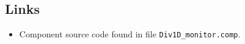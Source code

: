 \subsection*{Links}
\begin{itemize}
  \item Component source code found in file \texttt{Div1D\_monitor.comp}.
\end{itemize}
